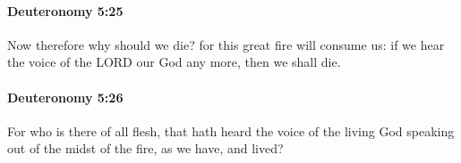 		\paragraph{Deuteronomy 5:25} %
			\label{DEUTERONOMY-5-25}

			Now therefore why should we die? for this great fire will consume us: if we hear the voice of the LORD our God any more, then we shall die.


		\paragraph{Deuteronomy 5:26} %
			\label{DEUTERONOMY-5-26}

			For who is there of all flesh, that hath heard the voice of the living God speaking out of the midst of the fire, as we have, and lived?


